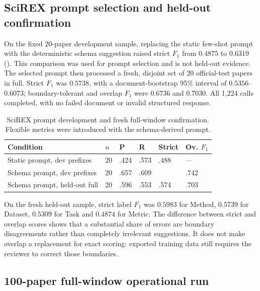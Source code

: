 \subsection{SciREX prompt selection and held-out confirmation}

On the fixed 20-paper development sample, replacing the static few-shot prompt
with the deterministic schema suggestion raised strict $F_1$ from $0.4875$ to
$0.6319$ (). This comparison was used for prompt
selection and is not held-out evidence. The selected prompt then processed a
fresh, disjoint set of 20 official-test papers in full. Strict $F_1$ was
$0.5738$, with a document-bootstrap 95\% interval of $0.5356$--$0.6073$;
boundary-tolerant and overlap $F_1$ were $0.6736$ and $0.7030$. All 1{,}224
calls completed, with no failed document or invalid structured response.

\begin{table}[!t]
\caption{SciREX prompt development and fresh full-window confirmation. Flexible
metrics were introduced with the schema-derived prompt.}
\label{tab:scirex-confirmation}
\footnotesize
\begin{tabular}{@{}L{2.35cm} C{0.65cm} C{0.65cm} C{0.75cm} C{0.8cm} C{0.75cm}@{}}
\toprule
\textbf{Condition} & $n$ & \textbf{P} & \textbf{R} & \textbf{Strict} & \textbf{Ov.} $F_1$ \\
\midrule
Static prompt, dev prefixes & 20 & .424 & .573 & .488 & --- \\
Schema prompt, dev prefixes & 20 & .657 & .609 &  & .742 \\
Schema prompt, held-out full & 20 & .596 & .553 & .574 & .703 \\
\bottomrule
\end{tabular}
\end{table}

On the fresh held-out sample, strict label $F_1$ was $0.5983$ for Method,
$0.5739$ for Dataset, $0.5309$ for Task and $0.4874$ for Metric. The difference
between strict and overlap scores shows that a substantial share of errors are
boundary disagreements rather than completely irrelevant suggestions. It does
not make overlap a replacement for exact scoring: exported training data still
requires the reviewer to correct those boundaries.

\subsection{100-paper full-window operational run}

